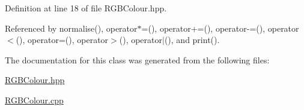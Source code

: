 \-Definition at line 18 of file \-R\-G\-B\-Colour.\-hpp.



\-Referenced by normalise(), operator$\ast$=(), operator+=(), operator-\/=(), operator$<$(), operator=(), operator$>$(), operator$|$(), and print().



\-The documentation for this class was generated from the following files\-:\begin{DoxyCompactItemize}
\item 
\hyperlink{RGBColour_8hpp}{\-R\-G\-B\-Colour.\-hpp}\item 
\hyperlink{RGBColour_8cpp}{\-R\-G\-B\-Colour.\-cpp}\end{DoxyCompactItemize}
